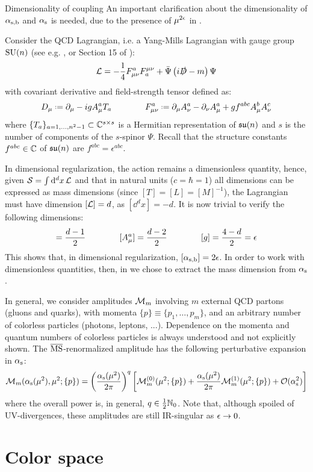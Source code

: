 \begin{observation}{Dimensionality of coupling}{}
  An important clarification about the dimensionality of $ \alpha_\text{s,b} $ and $ \alpha_\text{s} $ is needed, due to the presence of $ \mu^{2\epsilon} $ in .

  Consider the QCD Lagrangian, i.e. a Yang-Mills Lagrangian with gauge group $ \mathrm{SU}(n) $ (see e.g. \cite{Utiyama-1956,Yang-1954}, or Section 15 of \cite{Weinberg-1996}):
  \begin{equation}
    \mathcal{L} = - \frac{1}{4} F_{\mu \nu}^a F^{\mu \nu}_a + \bar{\Psi} \left( i \slashed{D} - m \right) \Psi
  \end{equation}
  with covariant derivative and field-strength tensor defined as:
  \begin{equation}
    D_\mu \defeq \pa_\mu - i g A_\mu^a T_a
    \qquad \qquad
    F_{\mu \nu}^a \defeq \pa_\mu A_\nu^a - \pa_\nu A_\mu^a + g f^{abc} A_\mu^b A_\nu^c
  \end{equation}
  where $ \{T_a\}_{a = 1, \dots, n^2 - 1} \subset \mathbb{C}^{s \times s} $ is a Hermitian representation of $ \mathfrak{su}(n) $ and $ s $ is the number of components of the $ s $-spinor $ \Psi $. Recall that the structure constants $ f^{abc} \in \mathbb{C} $ of $ \mathfrak{su}(n) $ are $ f^{abc} = \epsilon^{abc} $.

  In dimensional regularization, the action remains a dimensionless quantity, hence, given $ \mathcal{S} = \int \mathrm{d}^dx \, \mathcal{L} $ and that in natural units ($ c = \hbar = 1 $) all dimensions can be expressed as mass dimensions (since $ [T] = [L] = [M]^{-1} $), the Lagrangian must have dimension $ [\mathcal{L}] = d $, as $ [\dd^dx] = -d $. It is now trivial to verify the following dimensions:
  \begin{equation*}
    [\Psi] = \frac{d - 1}{2}
    \qquad \qquad
    [A_\mu^a] = \frac{d - 2}{2}
    \qquad \qquad
    [g] = \frac{4 - d}{2} = \de
  \end{equation*}
  This shows that, in dimensional regularization, $ [\alpha_\text{s,b}] = 2\epsilon $. In order to work with dimensionless quantities, then, in  we chose to extract the mass dimension from $ \alpha_\text{s} $.
\end{observation}

In general, we consider amplitudes $ \mathcal{M}_m $ involving $ m $ external QCD partons (gluons and quarks), with momenta $ \{p\} \equiv \{p_1, \dots, p_m\} $, and an arbitrary number of colorless particles (photons, leptons, ...). Dependence on the momenta and quantum numbers of colorless particles is always understood and not explicitly shown. The $ \overline{\text{MS}} $-renormalized amplitude has the following perturbative expansion in $ \alpha_\text{s} $:
\begin{equation}
  \mathcal{M}_m(\alpha_\text{s}(\mu^2), \mu^2 ; \{p\}) = \left( \frac{\alpha_\text{s}(\mu^2)}{2\pi} \right)^q \left[ \mathcal{M}_m^{(0)}(\mu^2 ; \{p\}) + \frac{\alpha_\text{s}(\mu^2)}{2\pi} \mathcal{M}_m^{(1)}(\mu^2 ; \{p\}) + \mathcal{O}(\alpha_\text{s}^2) \right]
\end{equation}
where the overall power is, in general, $ q \in \frac{1}{2} \mathbb{N}_0 $. Note that, although spoiled of UV-divergences, these amplitudes are still IR-singular as $ \epsilon \rightarrow 0 $.

\section{Color space}
\label{sec:color-space}










